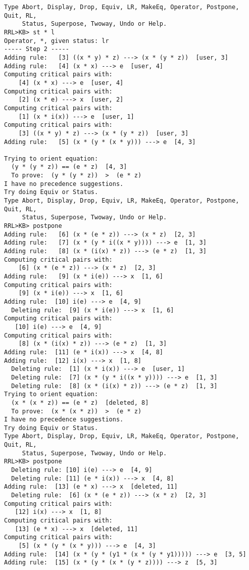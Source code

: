 \begin{verbatim}
Type Abort, Display, Drop, Equiv, LR, MakeEq, Operator, Postpone, Quit, RL,
     Status, Superpose, Twoway, Undo or Help.
RRL>KB> st * l
Operator, *, given status: lr
----- Step 2 -----
Adding rule:   [3] ((x * y) * z) ---> (x * (y * z))  [user, 3]
Adding rule:   [4] (x * x) ---> e  [user, 4]
Computing critical pairs with: 
    [4] (x * x) ---> e  [user, 4]
Computing critical pairs with: 
    [2] (x * e) ---> x  [user, 2]
Computing critical pairs with: 
    [1] (x * i(x)) ---> e  [user, 1]
Computing critical pairs with: 
    [3] ((x * y) * z) ---> (x * (y * z))  [user, 3]
Adding rule:   [5] (x * (y * (x * y))) ---> e  [4, 3]

Trying to orient equation: 
  (y * (y * z)) == (e * z)  [4, 3]
  To prove:  (y * (y * z))  >  (e * z)
I have no precedence suggestions.  
Try doing Equiv or Status.
Type Abort, Display, Drop, Equiv, LR, MakeEq, Operator, Postpone, Quit, RL,
     Status, Superpose, Twoway, Undo or Help.
RRL>KB> postpone
Adding rule:   [6] (x * (e * z)) ---> (x * z)  [2, 3]
Adding rule:   [7] (x * (y * i((x * y)))) ---> e  [1, 3]
Adding rule:   [8] (x * (i(x) * z)) ---> (e * z)  [1, 3]
Computing critical pairs with: 
    [6] (x * (e * z)) ---> (x * z)  [2, 3]
Adding rule:   [9] (x * i(e)) ---> x  [1, 6]
Computing critical pairs with: 
    [9] (x * i(e)) ---> x  [1, 6]
Adding rule:  [10] i(e) ---> e  [4, 9]
  Deleting rule:  [9] (x * i(e)) ---> x  [1, 6]
Computing critical pairs with: 
   [10] i(e) ---> e  [4, 9]
Computing critical pairs with: 
    [8] (x * (i(x) * z)) ---> (e * z)  [1, 3]
Adding rule:  [11] (e * i(x)) ---> x  [4, 8]
Adding rule:  [12] i(x) ---> x  [1, 8]
  Deleting rule:  [1] (x * i(x)) ---> e  [user, 1]
  Deleting rule:  [7] (x * (y * i((x * y)))) ---> e  [1, 3]
  Deleting rule:  [8] (x * (i(x) * z)) ---> (e * z)  [1, 3]
Trying to orient equation: 
  (x * (x * z)) == (e * z)  [deleted, 8]
  To prove:  (x * (x * z))  >  (e * z)
I have no precedence suggestions.  
Try doing Equiv or Status.
Type Abort, Display, Drop, Equiv, LR, MakeEq, Operator, Postpone, Quit, RL,
     Status, Superpose, Twoway, Undo or Help.
RRL>KB> postpone
  Deleting rule: [10] i(e) ---> e  [4, 9]
  Deleting rule: [11] (e * i(x)) ---> x  [4, 8]
Adding rule:  [13] (e * x) ---> x  [deleted, 11]
  Deleting rule:  [6] (x * (e * z)) ---> (x * z)  [2, 3]
Computing critical pairs with: 
   [12] i(x) ---> x  [1, 8]
Computing critical pairs with: 
   [13] (e * x) ---> x  [deleted, 11]
Computing critical pairs with: 
    [5] (x * (y * (x * y))) ---> e  [4, 3]
Adding rule:  [14] (x * (y * (y1 * (x * (y * y1))))) ---> e  [3, 5]
Adding rule:  [15] (x * (y * (x * (y * z)))) ---> z  [5, 3]

\end{verbatim}
